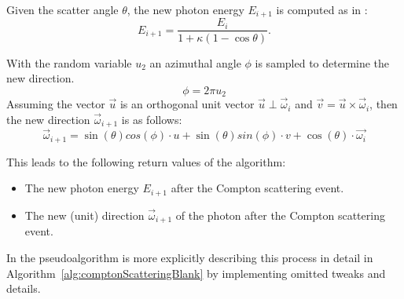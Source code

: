 Given the scatter angle $\theta$, the new photon energy $E_{i+1}$ is computed as in \cite{nelsoncompton}:
\begin{equation}
    E_{i+1} = \frac{E_i}{1 + \kappa (1 - \cos \theta)}.
\end{equation}

With the random variable $u_2$ an azimuthal angle $\phi$ is sampled to determine the new direction.
\begin{equation}
    \phi = 2\pi u_2
\end{equation}
Assuming the vector $\vec{u}$ is an orthogonal unit vector $\vec{u} \perp \vec{\omega}_i$ and $\vec{v} = \vec{u} \times \vec{\omega}_i$, then the new direction $\vec{\omega}_{i+1}$ is as follows:
\begin{equation}
    \vec{\omega}_{i+1} = \sin(\theta)cos(\phi)\cdot u + \sin(\theta)sin(\phi)\cdot v + \cos(\theta)\cdot \vec{\omega_i}
\end{equation}

This leads to the following return values of the algorithm:
\begin{itemize}
    \item The new photon energy $E_{i+1}$ after the Compton scattering event.
    \item The new (unit) direction $\vec{\omega}_{i+1}$ of the photon after the
    Compton scattering event.
\end{itemize}

In the pseudoalgorithm is more explicitly describing this process in detail in
Algorithm~\ref{alg:comptonScatteringBlank} by implementing omitted tweaks and
details.

